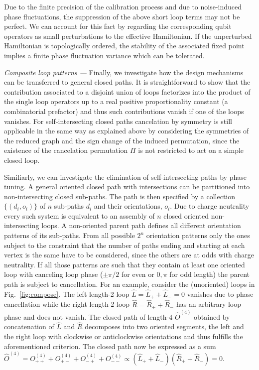 \documentclass[twocolumn,floats,prx,showpacs]{revtex4-1}
\begin{document}
Due to the finite precision of the calibration process and due to noise-induced phase fluctuations, the suppression of the above short loop terms may not be perfect. We can account for this fact by regarding the corresponding qubit operators as small perturbations to the effective Hamiltonian. If the unperturbed Hamiltonian is topologically ordered, the stability of the associated fixed point implies a finite phase fluctuation variance which can be tolerated.

\emph{Composite loop patterns ---}
Finally, we investigate how the design mechanisms can be transferred to general closed paths. It is straightforward to show that the contribution associated to a disjoint union of loops factorizes into the product of the single loop operators up to a real positive proportionality constant (a combinatorial prefactor) and thus such contributions vanish if one of the loops vanishes. 
For self-intersecting closed paths cancelation by symmetry is still applicable in the same way as explained above by considering the symmetries of the reduced graph and the sign change of the induced permutation, since the existence of the cancelation permutation $\Pi$ is not restricted to act on a simple closed loop. 

Similiarly, we can investigate the elimination of self-intersecting paths by phase tuning. A general oriented closed path with intersections can be partitioned into non-intersecting closed sub-paths. The path is then specified by a collection $\{(d_i,o_i)\}$ of $n$ sub-paths $d_i$ and their orientations, $o_i$.  Due to charge neutrality every such system is equivalent to an assembly of $n$ closed oriented non-intersecting loops. A non-oriented parent path defines all different orientation patterns of its sub-paths. From all possible $2^n$ orientation patterns only the ones subject to the constraint that the number of paths ending and starting at each vertex is the same have to be considered, since the others are at odds with charge neutrality. If all those patterns are such that they contain at least  one oriented loop with canceling loop phase ($\pm \pi/2$ for even or $0,\pi$ for odd length) the parent path is subject to cancellation. For an example, consider the (unoriented) loops in Fig.~\ref{fig:compose}. The left length-2 loop $\hat L= \hat L_+ + \hat L_-=0$ vanishes due to phase cancellation while the right length-2 loop $\hat R=\hat R_+ + \hat R_-$ has an arbitrary loop phase and does not vanish. The closed path of length-4 $\hat O^{(4)}$ obtained by concatenation of $\hat L$ and $\hat R$ decomposes into two oriented segments, the left and the right loop with clockwise or anticlockwise orientations and thus fulfills the aforementioned criterion. The closed path now be expressed as a sum $\hat O^{(4)}=O^{(4)}_{++}+O^{(4)}_{+-}+O^{(4)}_{-+}+O^{(4)}_{--} \propto (\hat L_+ + \hat L_-)(\hat R_+ + \hat R_-)=0$. 
\end{document}
